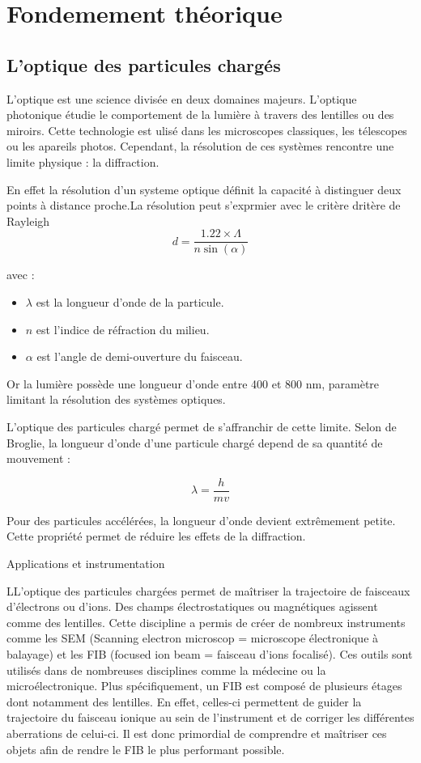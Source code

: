 \documentclass[a4paper]{report}
\begin{document}
\section{Fondemement théorique}

\subsection{L'optique des particules chargés}

L'optique est une science divisée en deux domaines majeurs. L'optique photonique étudie le comportement de la lumière
 à travers des lentilles ou des miroirs. Cette technologie est ulisé dans les microscopes classiques, les télescopes
 ou les apareils photos.
Cependant, la résolution de ces systèmes rencontre une limite physique : la diffraction.

En effet la résolution d'un systeme optique définit la capacité à distinguer deux points à distance proche.La résolution
peut s'exprmier avec le critère dritère de Rayleigh
\[
d = \frac{1.22 \times \Lambda}{n\sin(\alpha)}
\]

avec :

\begin{itemize}
    \item $\lambda$ est la longueur d'onde de la particule.
    \item $n$ est l'indice de réfraction du milieu.
    \item $\alpha$ est l'angle de demi-ouverture du faisceau.
\end{itemize} 

 Or la lumière possède une longueur d'onde entre 400 et 800 nm,
paramètre limitant la résolution des systèmes optiques. 

L'optique des particules chargé permet de s'affranchir de cette limite. Selon de Broglie, la longueur d'onde d'une
particule chargé depend de sa quantité de mouvement :

\[
\lambda = \frac{h}{mv}
\]

Pour des particules accélérées, la longueur d'onde devient extrêmement petite. 
Cette propriété permet de réduire  les effets de la diffraction.

Applications et instrumentation

LL'optique des particules chargées permet de maîtriser la trajectoire de faisceaux d'électrons ou d'ions. 
Des champs électrostatiques ou magnétiques agissent comme des lentilles. 
Cette discipline a permis de créer de 
nombreux instruments comme  les SEM (Scanning electron microscop = 
microscope électronique à balayage) et les FIB (focused ion beam = faisceau d’ions focalisé).
Ces outils sont 
utilisés dans de nombreuses disciplines comme la médecine ou la microélectronique.  
Plus spécifiquement, un FIB est composé de plusieurs étages dont notamment des 
lentilles. En effet, celles-ci permettent de guider la trajectoire du faisceau ionique au sein de 
l’instrument et de corriger les différentes aberrations de celui-ci. Il est donc primordial de 
comprendre et maîtriser ces objets afin de rendre le FIB le plus performant possible.  
\end{document}

